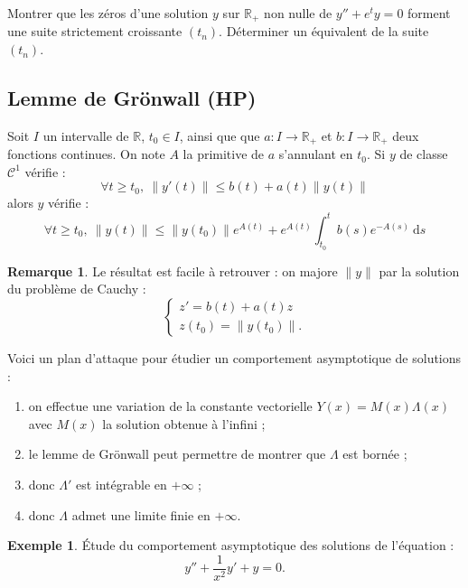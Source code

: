 \documentclass[french]{article}
\newcommand{\R}{\mathbb{R}}
\renewcommand{\d}{\text{d}}
\theoremstyle{plain}
\theoremstyle{definition}
\newtheorem*{ex}{Exemple}
\newtheorem*{rmq}{Remarque}
\theoremstyle{remark}
\begin{document}
\begin{exo}
	Montrer que les zéros d'une solution $y$ sur $\R_+$ non nulle de $y''+e^ty=0$ forment une suite strictement croissante $(t_n)$. Déterminer un équivalent de la suite $(t_n)$.
\end{exo}

\subsection{Lemme de Grönwall (HP)}

\begin{thm}%
	Soit $I$ un intervalle de $\R$, $t_0\in I$, ainsi que que $a:I\to\R_+$ et $b:I\to\R_+$ deux fonctions continues. On note $A$ la primitive de $a$ s'annulant en $t_0$. Si $y$ de classe $\mathcal{C}^1$ vérifie : $$\forall t\geqslant t_0,\ \lVert y'(t)\rVert\leqslant b(t)+a(t)\lVert y(t)\rVert$$ alors $y$ vérifie : $$\forall t\geqslant t_0,\ \lVert y(t)\rVert\leqslant\lVert y(t_0)\rVert e^{A(t)}+e^{A(t)}\int_{t_0}^{t}b(s)e^{-A(s)}\ \d s$$
\end{thm}

\begin{rmq}
	Le résultat est facile à retrouver : on majore $\lVert y\rVert$ par la solution du problème de Cauchy : $$\begin{cases}
		z'=b(t)+a(t)z \\
		z(t_0)=\lVert y(t_0)\rVert.
	\end{cases}$$
\end{rmq}

\begin{met}
	Voici un plan d'attaque pour étudier un comportement asymptotique de solutions :
	\begin{enumerate}
		\item on effectue une variation de la constante vectorielle $Y(x)=M(x)\Lambda(x)$ avec $M(x)$ la solution obtenue à l'infini ;
		\item le lemme de Grönwall peut permettre de montrer que $\Lambda$ est bornée ;
		\item donc $\Lambda'$ est intégrable en $+\infty$ ;
		\item donc $\Lambda$ admet une limite finie en $+\infty$.
	\end{enumerate}
\end{met}

\begin{ex}
	Étude du comportement asymptotique des solutions de l'équation : $$y''+\frac{1}{x^2}y'+y=0.$$
\end{ex}
\end{document}
